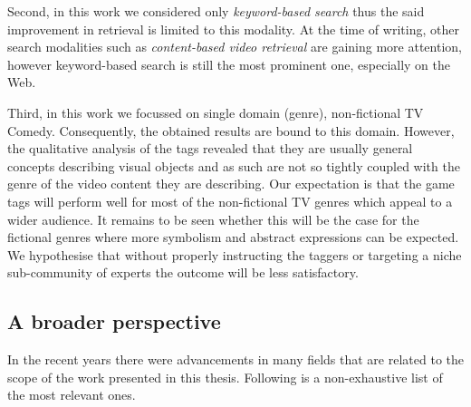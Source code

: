 Second, in this work we considered only \textit{keyword-based search} thus the said improvement in retrieval is limited to this modality. At the time of writing, other search modalities such as \textit{content-based video retrieval} \cite{veltkamp2013state} are gaining more attention, however keyword-based search is still the most prominent one, especially on the Web.

Third, in this work we focussed on single domain (genre), non-fictional TV Comedy. Consequently, the obtained results are bound to this domain. However, the qualitative analysis of the tags revealed that they are usually general concepts describing visual objects and as such are not so tightly coupled with the genre of the video content they are describing. Our expectation is that the game tags will perform well for most of the non-fictional TV genres which appeal to a wider audience. It remains to be seen whether this will be the case for the fictional genres where more symbolism and abstract expressions can be expected. We hypothesise that without properly instructing the taggers or targeting a niche sub-community of experts the outcome will be less satisfactory.

\subsection{A broader perspective}\label{con:bigger-picture}
In the recent years there were advancements in many fields that are related to the scope of the work presented in this thesis. Following is a non-exhaustive list of the most relevant ones.

